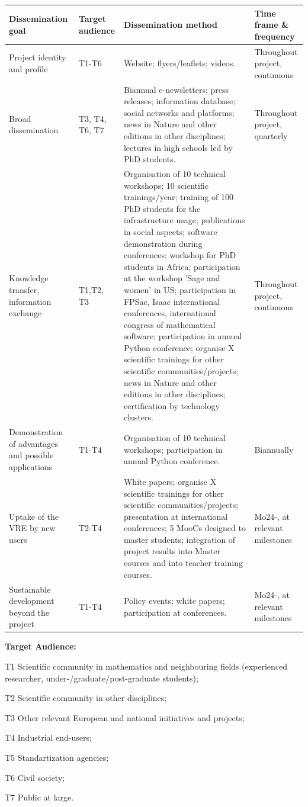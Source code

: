 \begin{flushleft}
\tablehead{}
\begin{supertabular}{|m{3cm}|m{1cm}| m{8cm} | m{2cm}|}
\hline
Dissemination goal &
Target audience&
Dissemination method &
Time frame \& frequency  \\\hline
Project identity and profile &
T1-T6
&
Website; flyers/leaflets; videos.
& 
Throughout project, continuous \\\hline
Broad dissemination &
T3, T4, T6, T7 
&
Biannual e-newsletters; press releases; information database; social networks and platforms; news  in Nature and other editions in other disciplines; lectures in high schools led by PhD students.
& 
Throughout project, quarterly \\\hline
Knowledge transfer, information exchange&
T1,T2, T3
&

Organisation of 10 technical workshops; 10 scientific trainings/year; training of 100 PhD students for the infrastructure usage; publications in social aspects; software demonstration during conferences; workshop for PhD students in Africa; participation at the workshop 'Sage and women' in US; participation in FPSac, Isaac international conferences, international congress of mathematical software; participation in annual Python conference; organise X scientific trainings for other scientific communities/projects; news  in Nature and other editions in other disciplines; certification by technology clusters.
& 
Throughout project, continuous  \\\hline
Demonstration of advantages and possible applications &
T1-T4
&
Organisation of 10 technical workshops; participation in annual Python conference.
& 
Biannually \\\hline
Uptake of the VRE by new users &
T2-T4
&
White papers; organise X scientific trainings for other scientific communities/projects; presentation at international conferences; 5 MooCs designed to master students; integration of project results into Master courses and into teacher training courses.
& 
Mo24-, at relevant milestones \\\hline
Sustainable development beyond the project &
T1-T4
&
Policy events; white papers; participation at conferences.
& 
Mo24-, at relevant milestones \\\hline
\end{supertabular}
\end{flushleft}

{\bf Target Audience:}
\begin{compactenum}
\item[T1] Scientific community in mathematics and neighbouring fields (experienced researcher, under-/graduate/post-graduate students);
\item[T2] Scientific community in other disciplines;
\item[T3] Other relevant European and national initiatives and projects;
\item[T4] Industrial end-users;
\item[T5] Standartization agencies;
\item[T6] Civil society;
\item[T7] Public at large.
\end{compactenum}

